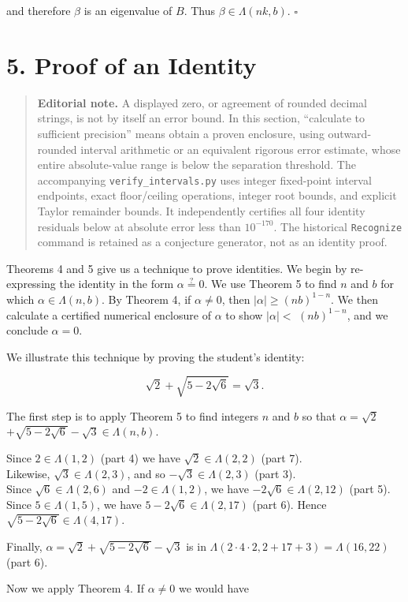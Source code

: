 \documentclass[11pt,letterpaper]{article}
\newcommand{\editorialnote}[1]{\begin{quote}\small\noindent
  \textbf{Editorial note.} #1\end{quote}}
\begin{document}
and therefore $\beta$ is an eigenvalue of $B$. Thus $\beta \in \Lambda(n k, b)$. \(\square\)

\section*{5. Proof of an Identity}
\editorialnote{A displayed zero, or agreement of rounded decimal strings, is not by itself an error bound. In this section, ``calculate to sufficient precision'' means obtain a proven enclosure, using outward-rounded interval arithmetic or an equivalent rigorous error estimate, whose entire absolute-value range is below the separation threshold. The accompanying \texttt{verify\_intervals.py} uses integer fixed-point interval endpoints, exact floor/ceiling operations, integer root bounds, and explicit Taylor remainder bounds. It independently certifies all four identity residuals below at absolute error less than $10^{-170}$. The historical \texttt{Recognize} command is retained as a conjecture generator, not as an identity proof.} Theorems 4 and 5 give us a technique to prove identities. We begin by re-expressing the identity in the form $\alpha \stackrel{?}{=} 0$. We use Theorem 5 to find $n$ and $b$ for which $\alpha \in \Lambda(n, b)$. By Theorem 4, if $\alpha \neq 0$, then $|\alpha| \geq(n b)^{1-n}$. We then calculate a certified numerical enclosure of $\alpha$ to show $|\alpha|<$ $(n b)^{1-n}$, and we conclude $\alpha=0$.

We illustrate this technique by proving the student's identity:

\[
\sqrt{2}+\sqrt{5-2 \sqrt{6}}=\sqrt{3} .
\]

The first step is to apply Theorem 5 to find integers $n$ and $b$ so that $\alpha=\sqrt{2}$ $+\sqrt{5-2 \sqrt{6}}-\sqrt{3} \in \Lambda(n, b)$.

Since $2 \in \Lambda(1,2)$ (part 4) we have $\sqrt{2} \in \Lambda(2,2)$ (part 7).\\
Likewise, $\sqrt{3} \in \Lambda(2,3)$, and so $-\sqrt{3} \in \Lambda(2,3)$ (part 3).\\
Since $\sqrt{6} \in \Lambda(2,6)$ and $-2 \in \Lambda(1,2)$, we have $-2 \sqrt{6} \in \Lambda(2,12)$ (part 5). Since $5 \in \Lambda(1,5)$, we have $5-2 \sqrt{6} \in \Lambda(2,17)$ (part 6). Hence $\sqrt{5-2 \sqrt{6}} \in \Lambda(4,17)$.

Finally, $\alpha=\sqrt{2}+\sqrt{5-2 \sqrt{6}}-\sqrt{3}$ is in $\Lambda(2 \cdot 4 \cdot 2,2+17+3)=\Lambda(16,22)$ (part 6).

Now we apply Theorem 4. If $\alpha \neq 0$ we would have
\end{document}
